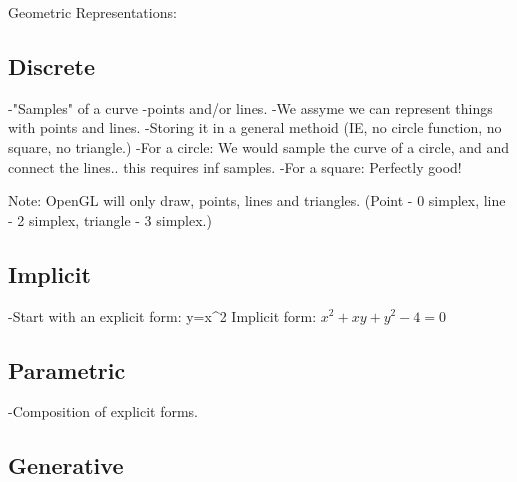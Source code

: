 %
Geometric Representations:

\subsection{Discrete}
-"Samples" of a curve
-points and/or lines.
-We assyme we can represent things with points and lines.
-Storing it in a general methoid (IE, no circle function, no square, no triangle.)
-For a circle: We would sample the curve of a circle, and and connect the lines.. this requires inf samples.
-For a square: Perfectly good!

Note: OpenGL will only draw, points, lines and triangles. (Point - 0 simplex, line - 2 simplex, triangle - 3 simplex.)

\subsection{Implicit}

-Start with an explicit form: y=x^2
Implicit form: $x^2+xy+y^2-4=0$

\subsection{Parametric}
-Composition of explicit forms.
\subsection{Generative}

